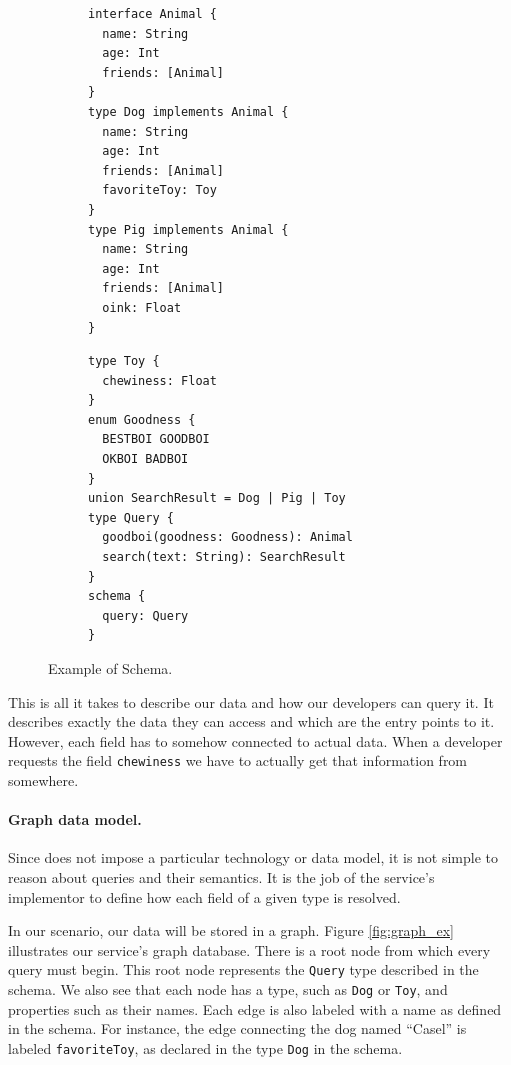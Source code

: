 \begin{figure}
    \centering
    \begin{subfigure}{.5\linewidth}
    
    \begin{verbatim}
interface Animal {		
  name: String
  age: Int
  friends: [Animal]
}
type Dog implements Animal {
  name: String
  age: Int
  friends: [Animal]
  favoriteToy: Toy
}
type Pig implements Animal {
  name: String
  age: Int
  friends: [Animal]
  oink: Float
}
    \end{verbatim}
    \end{subfigure}%
    \begin{subfigure}{.5\linewidth}
    \begin{verbatim}
type Toy {
  chewiness: Float
}
enum Goodness { 
  BESTBOI GOODBOI 
  OKBOI BADBOI 
}
union SearchResult = Dog | Pig | Toy
type Query {
  goodboi(goodness: Goodness): Animal
  search(text: String): SearchResult
}
schema {
  query: Query
}
    \end{verbatim}
    \end{subfigure}
    
    \caption{Example of \gql Schema.}
    \label{fig:schema_ex}
\end{figure}

This is all it takes to describe our data and how our developers can query it. It describes exactly the data they can access and which are the entry points to it. However, each field has to somehow connected to actual data. When a developer requests the field \texttt{chewiness} we have to actually get that information from somewhere.

\paragraph{Graph data model.}
Since \gql does not impose a particular technology or data model, it is not simple to reason about queries and their semantics. It is the job of the service's implementor to define how  each field of a given type is resolved.

In our scenario, our data will be stored in a graph. Figure \ref{fig:graph_ex} illustrates our service's graph database. There is a root node from which every query must begin. This root node represents the \texttt{Query} type described in the schema. We also see that each node has a type, such as \texttt{Dog} or \texttt{Toy}, and properties such as their names. Each edge is also labeled with a name as defined in the schema. For instance, the edge connecting the dog named ``Casel'' is labeled \texttt{favoriteToy}, as declared in the type \texttt{Dog} in the schema.

